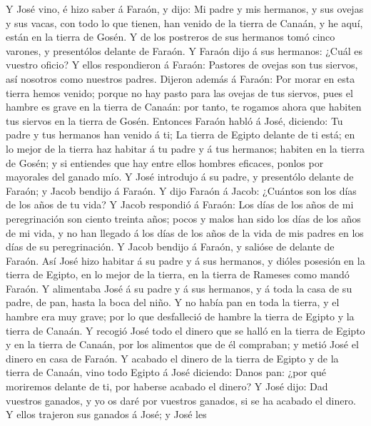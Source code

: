  Y José vino, é hizo saber á Faraón, y dijo: Mi padre y
mis hermanos, y sus ovejas y sus vacas, con todo lo que tienen, han
venido de la tierra de Canaán, y he aquí, están en la tierra de Gosén.
 Y de los postreros de sus hermanos tomó cinco varones, y
presentólos delante de Faraón.  Y Faraón dijo á sus
hermanos: ¿Cuál es vuestro oficio? Y ellos respondieron á Faraón:
Pastores de ovejas son tus siervos, así nosotros como nuestros padres.
 Dijeron además á Faraón: Por morar en esta tierra hemos
venido; porque no hay pasto para las ovejas de tus siervos, pues el
hambre es grave en la tierra de Canaán: por tanto, te rogamos ahora que
habiten tus siervos en la tierra de Gosén.  Entonces
Faraón habló á José, diciendo: Tu padre y tus hermanos han venido á ti;
 La tierra de Egipto delante de ti está; en lo mejor de la
tierra haz habitar á tu padre y á tus hermanos; habiten en la tierra de
Gosén; y si entiendes que hay entre ellos hombres eficaces, ponlos por
mayorales del ganado mío.  Y José introdujo á su padre, y
presentólo delante de Faraón; y Jacob bendijo á Faraón.  Y
dijo Faraón á Jacob: ¿Cuántos son los días de los años de tu vida?
 Y Jacob respondió á Faraón: Los días de los años de mi
peregrinación son ciento treinta años; pocos y malos han sido los días
de los años de mi vida, y no han llegado á los días de los años de la
vida de mis padres en los días de su peregrinación.  Y
Jacob bendijo á Faraón, y salióse de delante de Faraón. 
Así José hizo habitar á su padre y á sus hermanos, y dióles posesión en
la tierra de Egipto, en lo mejor de la tierra, en la tierra de Rameses
como mandó Faraón.  Y alimentaba José á su padre y á sus
hermanos, y á toda la casa de su padre, de pan, hasta la boca del niño.
 Y no había pan en toda la tierra, y el hambre era muy
grave; por lo que desfalleció de hambre la tierra de Egipto y la tierra
de Canaán.  Y recogió José todo el dinero que se halló en
la tierra de Egipto y en la tierra de Canaán, por los alimentos que de
él compraban; y metió José el dinero en casa de Faraón. 
Y acabado el dinero de la tierra de Egipto y de la tierra de Canaán,
vino todo Egipto á José diciendo: Danos pan: ¿por qué moriremos delante
de ti, por haberse acabado el dinero?  Y José dijo: Dad
vuestros ganados, y yo os daré por vuestros ganados, si se ha acabado el
dinero.  Y ellos trajeron sus ganados á José; y José les
